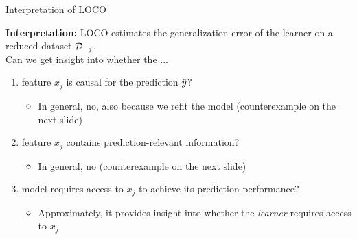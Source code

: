 \documentclass[10pt,compress,t,notes=noshow, xcolor=table]{beamer}
\begin{document}
\begin{frame}{Interpretation of LOCO}

\textbf{Interpretation:} LOCO estimates the generalization error of the learner on a reduced dataset $\mathcal{D}_{-j}$.\\
\lz
Can we get insight into whether the ...
\begin{enumerate}
    \item feature $x_j$ is causal for the prediction $\hat{y}$?
    \begin{itemize}
      \item In general, no, also because we refit the model (counterexample on the next slide)
    \end{itemize}
    \item feature $x_j$ contains prediction-relevant information?
    \begin{itemize}
      \item In general, no (counterexample on the next slide)
    \end{itemize}
    \item model requires access to $x_j$ to achieve its prediction performance?
    \begin{itemize}
      \item Approximately, it provides insight into whether the \textit{learner} requires access to $x_j$
    \end{itemize}
\end{enumerate}
\end{frame}
\end{document}
